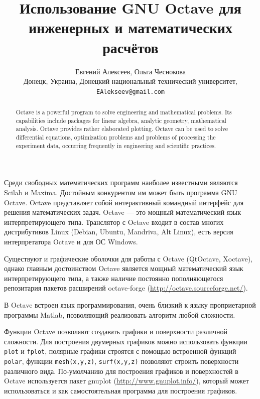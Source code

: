 \documentclass[10pt, a5paper]{article}
\begin{document}
\title{Использование GNU Octave для инженерных и математических расчётов}

\author{Евгений Алексеев, Ольга Чеснокова\\
\small Донецк, Украина, Донецкий национальный технический университет,\\ 
\small \texttt{EAlekseev@gmail.com}
}
\maketitle

\begin{abstract}
Octave is a powerful program to solve engineering and mathematical problems. Its capabilities include packages for linear algebra, analytic geometry, mathematical analysis. Octave provides rather elaborated plotting. Octave can be used to solve differential equations, optimization problems and problems of processing the experiment data, occurring frequently in engineering and scientific practices.
\end{abstract}

Среди свободных математических программ наиболее известными являются Scilab и Maxima. Достойным конкурентом им может быть программа GNU Octave. Octave представляет собой  интерактивный командный интерфейс для решения математических задач. Octave --- это мощный математический язык  интерпретирующего типа. Транслятор с Octave входит в состав многих дистрибутивов Linux (Debian, Ubuntu, Mandriva, Alt Linux), есть версия интерпретатора Octave и для ОС Windows.

Существуют и графические оболочки для работы с Octave (QtOctave, Xoctave), однако главным достоинством Octave является мощный математический язык интерпретирующего типа, а также наличие постоянно пополняющегося репозитария пакетов расширений octave-forge (\url{http://octave.sourceforge.net/}). 

В Octave встроен язык программирования, очень близкий к языку проприетарной программы Matlab, позволяющий  реализовать алгоритм любой сложности.

Функции Octave позволяют создавать графики и поверхности различной сложности. Для построения двумерных графиков можно использовать функции \verb!plot! и \verb!fplot!, полярные графики строятся с помощью встроенной функций \verb!polar!, функции \verb!mesh(x,y,z)!, \verb!surf(x,y,z)! позволяют строить поверхности различного вида. По-умолчанию для построения графиков и поверхностей в Octave используется пакет gnuplot (\url{http://www.gnuplot.info/}), который может использоваться и как самостоятельная программа для построения графиков.
\end{document}
